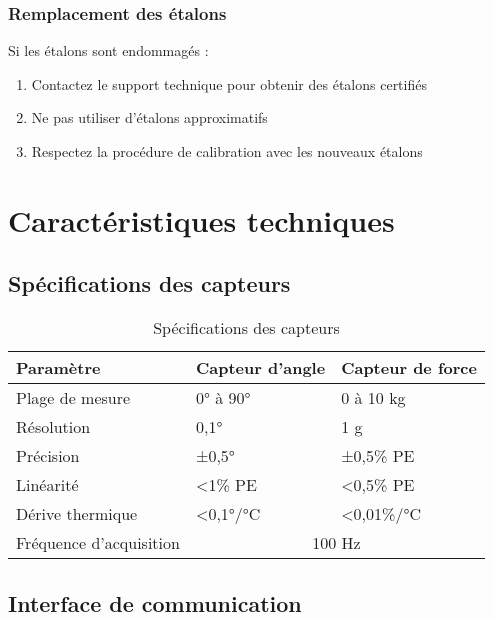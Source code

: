 \documentclass[12pt,a4paper]{article}
\begin{document}
\subsubsection{Remplacement des étalons}

Si les étalons sont endommagés :
\begin{enumerate}
    \item Contactez le support technique pour obtenir des étalons certifiés
    \item Ne pas utiliser d'étalons approximatifs
    \item Respectez la procédure de calibration avec les nouveaux étalons
\end{enumerate}

\section{Caractéristiques techniques}

\subsection{Spécifications des capteurs}

\begin{table}[H]
\centering
\begin{tabular}{|l|l|l|}
\hline
\textbf{Paramètre} & \textbf{Capteur d'angle} & \textbf{Capteur de force} \\
\hline
Plage de mesure & 0° à 90° & 0 à 10 kg \\
\hline
Résolution & 0,1° & 1 g \\
\hline
Précision & ±0,5° & ±0,5\% PE \\
\hline
Linéarité & <1\% PE & <0,5\% PE \\
\hline
Dérive thermique & <0,1°/°C & <0,01\%/°C \\
\hline
Fréquence d'acquisition & \multicolumn{2}{|c|}{100 Hz} \\
\hline
\end{tabular}
\caption{Spécifications des capteurs}
\label{tab:specs_capteurs}
\end{table}

\subsection{Interface de communication}
\end{document}
